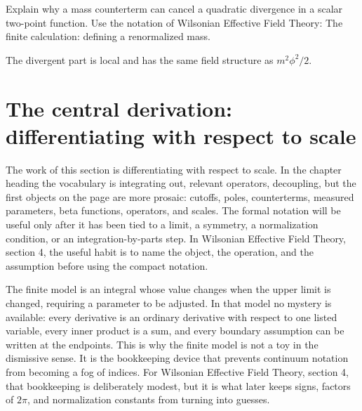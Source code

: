 \begin{exercise}
Explain why a mass counterterm can cancel a quadratic divergence in a scalar two-point function.  Use the notation of Wilsonian Effective Field Theory: The finite calculation: defining a renormalized mass.
\begin{answer}
The divergent part is local and has the same field structure as \(m^2\phi^2/2\).
\end{answer}
\end{exercise}



\section{The central derivation: differentiating with respect to scale}













The work of this section is differentiating with respect to scale.  In the chapter heading the vocabulary is integrating out, relevant operators, decoupling, but the first objects on the page are more prosaic: cutoffs, poles, counterterms, measured parameters, beta functions, operators, and scales.  The formal notation will be useful only after it has been tied to a limit, a symmetry, a normalization condition, or an integration-by-parts step.  In Wilsonian Effective Field Theory, section 4, the useful habit is to name the object, the operation, and the assumption before using the compact notation.

The finite model is an integral whose value changes when the upper limit is changed, requiring a parameter to be adjusted.  In that model no mystery is available: every derivative is an ordinary derivative with respect to one listed variable, every inner product is a sum, and every boundary assumption can be written at the endpoints.  This is why the finite model is not a toy in the dismissive sense.  It is the bookkeeping device that prevents continuum notation from becoming a fog of indices.  For Wilsonian Effective Field Theory, section 4, that bookkeeping is deliberately modest, but it is what later keeps signs, factors of \(2\pi\), and normalization constants from turning into guesses.

